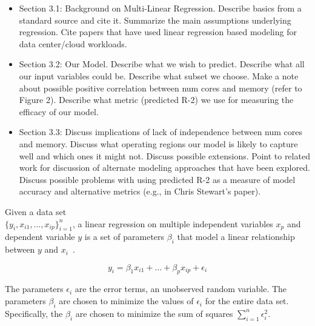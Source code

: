 \begin{itemize}
\item Section 3.1: Background on Multi-Linear Regression. Describe basics from a standard source and cite it. Summarize the main assumptions underlying regression. Cite papers that have used linear regression based modeling for data center/cloud workloads. 
\item Section 3.2: Our Model. Describe what we wish to predict. Describe what all our input variables could be. Describe what subset we choose. Make a note about possible positive correlation between num cores and memory (refer to Figure 2). Describe what metric (predicted R-2) we use for measuring the efficacy of our model. 
\item Section 3.3: Discuss implications of lack of independence between num cores and memory. Discuss what operating regions our model is likely to capture well and which ones it might not. Discuss possible extensions. Point to related work for discussion of alternate modeling approaches that have been explored. Discuss possible problems with using predicted R-2 as a measure of model accuracy and alternative metrics (e.g., in Chris Stewart's paper). 
\end{itemize}

 Given a data set \\ $\{y_i,x_{i1},\ldots,x_{ip}\}^n_{i=1}$, a linear regression on multiple independent variables $x_{p}$ and dependent variable $y$ is a set of parameters $\beta_i$ that model a linear relationship between $y$ and $x_{i}$~\cite{CMUStatsBook}.

\begin{displaymath}{
y_i = \beta_1 x_{i1}+\ldots+\beta_{p}x_{ip}+\epsilon_i
}\end{displaymath}

The parameters $\epsilon_i$ are the error terms, an unobserved random variable.  The parameters $\beta_i$ are chosen to minimize the values of $\epsilon_i$ for the entire data set.  Specifically, the $\beta_i$ are chosen to minimize the sum of squares $\sum_{i=1}^{n} \epsilon^2_i$.


